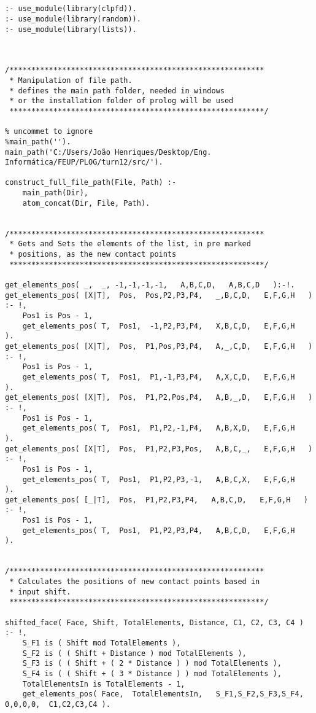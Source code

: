 \begin{lstlisting}


:- use_module(library(clpfd)).
:- use_module(library(random)).
:- use_module(library(lists)).



/**********************************************************
 * Manipulation of file path.
 * defines the main path folder, needed in windows
 * or the installation folder of prolog will be used
 **********************************************************/
 
% uncommet to ignore
%main_path('').
main_path('C:/Users/João Henriques/Desktop/Eng. Informática/FEUP/PLOG/turn12/src/').

construct_full_file_path(File, Path) :-
	main_path(Dir),
	atom_concat(Dir, File, Path).
	
	
/**********************************************************
 * Gets and Sets the elements of the list, in pre marked
 * positions, as the new contact points
 **********************************************************/
 
get_elements_pos( _,  _, -1,-1,-1,-1,   A,B,C,D,   A,B,C,D   ):-!.
get_elements_pos( [X|T],  Pos,  Pos,P2,P3,P4,   _,B,C,D,   E,F,G,H   ) :- !,
	Pos1 is Pos - 1,
	get_elements_pos( T,  Pos1,  -1,P2,P3,P4,   X,B,C,D,   E,F,G,H   ).
get_elements_pos( [X|T],  Pos,  P1,Pos,P3,P4,   A,_,C,D,   E,F,G,H   ) :- !,
	Pos1 is Pos - 1,
	get_elements_pos( T,  Pos1,  P1,-1,P3,P4,   A,X,C,D,   E,F,G,H   ).
get_elements_pos( [X|T],  Pos,  P1,P2,Pos,P4,   A,B,_,D,   E,F,G,H   ) :- !,
	Pos1 is Pos - 1,
	get_elements_pos( T,  Pos1,  P1,P2,-1,P4,   A,B,X,D,   E,F,G,H   ).
get_elements_pos( [X|T],  Pos,  P1,P2,P3,Pos,   A,B,C,_,   E,F,G,H   ) :- !,
	Pos1 is Pos - 1,
	get_elements_pos( T,  Pos1,  P1,P2,P3,-1,   A,B,C,X,   E,F,G,H   ).
get_elements_pos( [_|T],  Pos,  P1,P2,P3,P4,   A,B,C,D,   E,F,G,H   ) :- !,
	Pos1 is Pos - 1,
	get_elements_pos( T,  Pos1,  P1,P2,P3,P4,   A,B,C,D,   E,F,G,H   ).

	
/**********************************************************
 * Calculates the positions of new contact points based in
 * input shift.
 **********************************************************/

shifted_face( Face, Shift, TotalElements, Distance, C1, C2, C3, C4 ) :- !,
	S_F1 is ( Shift mod TotalElements ),
	S_F2 is ( ( Shift + Distance ) mod TotalElements ),
	S_F3 is ( ( Shift + ( 2 * Distance ) ) mod TotalElements ),
	S_F4 is ( ( Shift + ( 3 * Distance ) ) mod TotalElements ),
	TotalElementsIn is TotalElements - 1,
	get_elements_pos( Face,  TotalElementsIn,   S_F1,S_F2,S_F3,S_F4,  0,0,0,0,  C1,C2,C3,C4 ).


\end{lstlisting}
